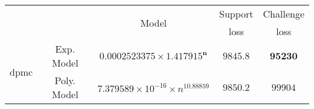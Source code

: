 \begin{tabular}{ccccc} 
\hline 
 &  & \multirow{2}{*}{Model} & Support & Challenge\tabularnewline 
 &  &  & loss  & loss\tabularnewline 
\hline 
\hline 
\multirow{2}{*}{dpmc} & Exp. Model & $\mathbf{0.0002523375\times 1.417915^{n}}$ & $\mathbf{9845.8}$ & $\mathbf{95230}$ \tabularnewline 
 & Poly. Model & $7.379589\times10^{-16}\times n^{10.88859}$ & $9850.2$ & $99904$ \tabularnewline 
\hline 
\end{tabular} 

